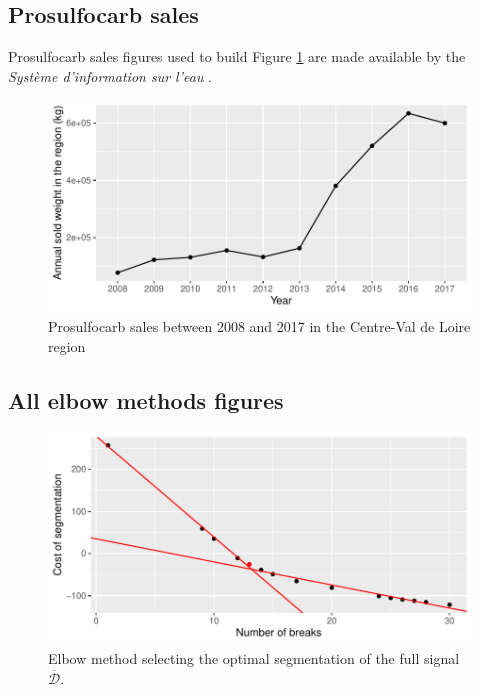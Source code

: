 \begin{appendices}
\subsection{Prosulfocarb sales}\label{section:sale}

Prosulfocarb sales figures used to build Figure \ref{fig:sale} are made available by the \emph{Système d'information sur l'eau} \cite{BNVD}.

\begin{figure}[ht]
  \centering
  \includegraphics[]{figs/App/Sales_pro.pdf}
  \caption{Prosulfocarb sales between 2008 and 2017 in the Centre-Val de Loire region}
  \label{fig:sale}
\end{figure}

\subsection{All elbow methods figures}\label{section:elb}

\begin{figure}[ht]
  \centering
  \includegraphics[]{figs/App/Elbow_seg.pdf}
  \caption{Elbow method selecting the optimal segmentation of the full signal $\overline{\mathcal{D}}$.}
  \label{fig:elb_seg}
\end{figure}


\end{appendices}

